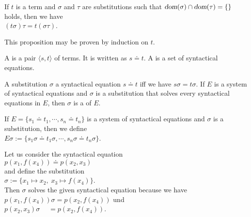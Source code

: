 \begin{Proposition} \label{satz:composition}
    If $t$ is a term and $\sigma$ and $\tau$ are substitutions such that  
    $\textsl{dom}(\sigma) \cap \textsl{dom}(\tau) = \{\}$ holds, then we have
    \\[0.2cm]
    \hspace*{1.3cm} $(t \sigma)\tau = t (\sigma\tau)$.
    \eox
\end{Proposition}
This proposition may be proven by induction on $t$.

\begin{Definition} 
  A   is a pair $\langle s, t \rangle$ of terms.
  It is written as $s \doteq t$. 
  A   is a set of syntactical
  equations.
  \eox
\end{Definition}


\begin{Definition}[Unifier]
  A substitution $\sigma$  a syntactical equation $s \doteq t$ iff we have $s\sigma = t\sigma$.
  If $E$ is a system of syntactical equations and $\sigma$ is a substitution that solves
  every syntactical equations in $E$, then $\sigma$ is a    of $E$.
  \eox
\end{Definition}

\noindent
If $E = \{ s_1 \doteq t_1, \cdots, s_n \doteq t_n \}$ is a system of syntactical equations and $\sigma$ is a
substitution, then we define
\\[0.2cm]
\hspace*{1.3cm}  $E\sigma := \{ s_1\sigma \doteq t_1\sigma, \cdots, s_n\sigma \doteq t_n\sigma \}$.
\vspace{0.3cm}

\exampleEng
Let us consider the syntactical equation
\\[0.2cm]
\hspace*{1.3cm}
$p(x_1, f(x_4)) \doteq p( x_2, x_3)$
\\[0.2cm]
and define the substitution
\\[0.2cm]
\hspace*{1.3cm}
$\sigma := \{ x_1 \mapsto x_2,\; x_3 \mapsto f(x_4) \}$.
\\[0.2cm]
Then $\sigma$ solves the given syntactical equation because we have
\\[0.2cm]
\hspace*{1.3cm}
$p(x_1, f(x_4))\sigma = p(x_2, f(x_4))$ \quad und \quad \\[0.2cm]
\hspace*{1.3cm}
$p(x_2, x_3)\sigma \;\quad = p(x_2, f(x_4))$.  \eox

